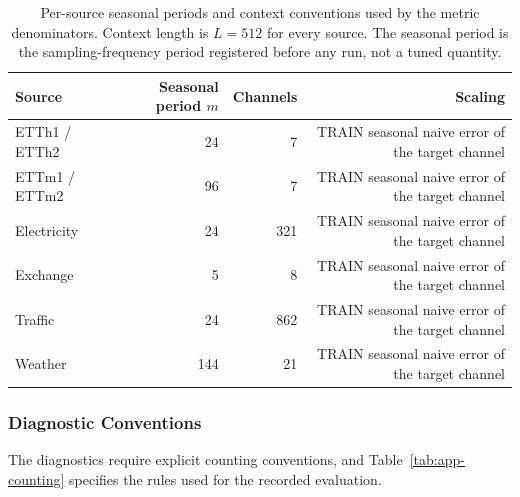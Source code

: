 \documentclass{article}
\begin{document}
\begin{table}[htbp]
  \caption{Per-source seasonal periods and context conventions used by the metric
  denominators. Context length is $L = 512$ for every source. The seasonal period is the
  sampling-frequency period registered before any run, not a tuned quantity.}
  \label{tab:app-seasonality}
  \centering
  \small
  \setlength{\tabcolsep}{4pt}
\begin{tabular*}{\textwidth}{@{\extracolsep{\fill}}lrrr@{}}
    \toprule
    Source & Seasonal period $m$ & Channels & Scaling \\
    \midrule
    ETTh1 / ETTh2 & 24 & 7 & TRAIN seasonal naive error of the target channel \\
    ETTm1 / ETTm2 & 96 & 7 & TRAIN seasonal naive error of the target channel \\
    Electricity & 24 & 321 & TRAIN seasonal naive error of the target channel \\
    Exchange & 5 & 8 & TRAIN seasonal naive error of the target channel \\
    Traffic & 24 & 862 & TRAIN seasonal naive error of the target channel \\
    Weather & 144 & 21 & TRAIN seasonal naive error of the target channel \\
    \bottomrule
  \end{tabular*}
\end{table}

\subsubsection{Diagnostic Conventions}
\label{app:diagnostic-conventions}
The diagnostics require explicit counting conventions, and
Table~\ref{tab:app-counting} specifies the rules used for the recorded evaluation.
\end{document}
